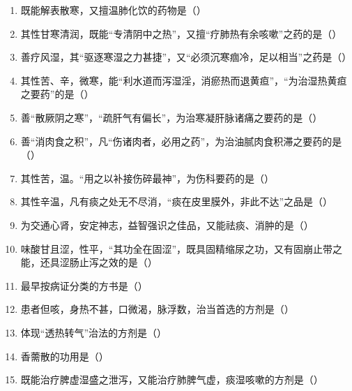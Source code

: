 \documentclass[a4paper,11pt]{ctexart}
\begin{document}
\begin{enumerate}
      \item 既能解表散寒，又擅温肺化饮的药物是（\quad）
      \item 其性甘寒清润，既能“专清阴中之热”，又擅“疗肺热有余咳嗽”之药的是（\quad）
      \item 善疗风湿，其“驱逐寒湿之力甚捷”，又“必须沉寒痼冷，足以相当”之药是（\quad）
      \item 其性苦、辛，微寒，能“利水道而泻湿淫，消瘀热而退黄疸”，“为治湿热黄疸之要药”的是（\quad）
      \item 善“散厥阴之寒”，“疏肝气有偏长”，为治寒凝肝脉诸痛之要药的是（\quad）
      \item 善“消肉食之积”，凡“伤诸肉者，必用之药”，为治油腻肉食积滞之要药的是（\quad）
      \item 其性苦，温。“用之以补接伤碎最神”，为伤科要药的是（\quad）
      \item 其性辛温，凡有痰之处无不尽消，“痰在皮里膜外，非此不达”之品是（\quad）
      \item 为交通心肾，安定神志，益智强识之佳品，又能祛痰、消肿的是（\quad）
      \item 味酸甘且涩，性平，“其功全在固涩”，既具固精缩尿之功，又有固崩止带之能，还具涩肠止泻之效的是（\quad）
      \item 最早按病证分类的方书是（\quad）
      \item 患者但咳，身热不甚，口微渴，脉浮数，治当首选的方剂是（\quad）
      \item 体现“透热转气”治法的方剂是（\quad）
      \item 香薷散的功用是（\quad）
      \item 既能治疗脾虚湿盛之泄泻，又能治疗肺脾气虚，痰湿咳嗽的方剂是（\quad）

\end{enumerate}
\end{document}
